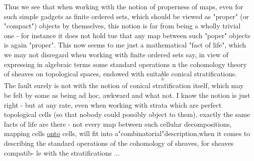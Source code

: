 
Thus we see that when working with the notion of properness of
maps, even for such simple gadgets as finite ordered sets, which 
should be viewed as "proper" (or "compact") objects by themselves,
this notion is far from being a wholly trivial one - for instance it
does not hold tue that any map between such "poper" objects is again
"proper". This now seems to me just a mathematical "fact of life",
which we may not disregard when working with finite ordered sets say,
in view of expressing in algebraic terms some standard operations n
the cohomology theory of sheaves on topological spaces, endowed with
suita$\underset{b}{b}$le conical stratifications. The fault surely is not with the
notion of conical stratification itself, which may be felt by some
as being ad hoc, awkward and what not. I know the notion is just
right - but at any rate, even when working with strata which are
perfect topological cells (so that nobody could possibly object to
them), exactly the same facts of life are there - \hand{(}not every map 
between such cellular decompositions, mapping cells \uline{onto} cells, will
fit into a"combinatorial"description,when it comes to describing the
standard operations of the cohomology of sheaves, for sheaves compatib-%
le with the stratifications ...

